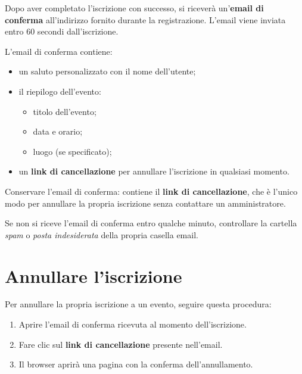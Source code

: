 \documentclass[a4paper,11pt,oneside]{book}
\begin{document}
Dopo aver completato l'iscrizione con successo, si ricever\`a un'\textbf{email di conferma} all'indirizzo fornito durante la registrazione. L'email viene inviata entro 60 secondi dall'iscrizione.

L'email di conferma contiene:

\begin{itemize}[leftmargin=1.5em]
  \item un saluto personalizzato con il nome dell'utente;
  \item il riepilogo dell'evento:
    \begin{itemize}
      \item titolo dell'evento;
      \item data e orario;
      \item luogo (se specificato);
    \end{itemize}
  \item un \textbf{link di cancellazione} per annullare l'iscrizione in qualsiasi momento.
\end{itemize}

\begin{dangerbox}
Conservare l'email di conferma: contiene il \textbf{link di cancellazione}, che \`e l'unico modo per annullare la propria iscrizione senza contattare un amministratore.
\end{dangerbox}

\begin{infobox}
Se non si riceve l'email di conferma entro qualche minuto, controllare la cartella \textit{spam} o \textit{posta indesiderata} della propria casella email.
\end{infobox}

\section{Annullare l'iscrizione}
\label{sec:annullamento-esterno}

Per annullare la propria iscrizione a un evento, seguire questa procedura:

\begin{enumerate}[leftmargin=1.5em]
  \item Aprire l'email di conferma ricevuta al momento dell'iscrizione.
  \item Fare clic sul \textbf{link di cancellazione} presente nell'email.
  \item Il browser aprir\`a una pagina con la conferma dell'annullamento.
\end{enumerate}
\end{document}
